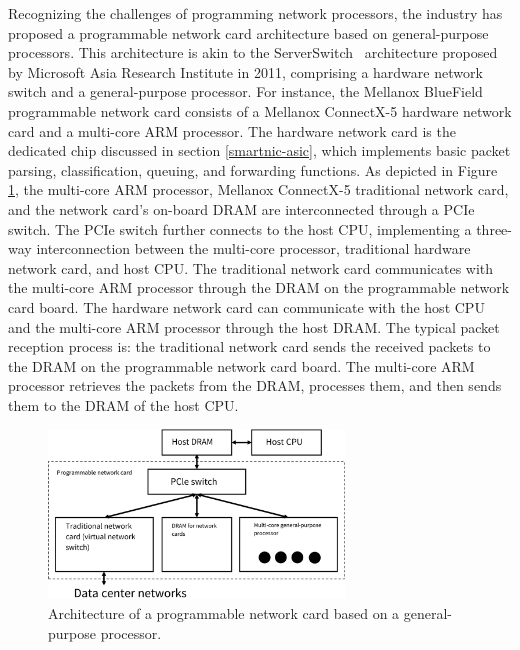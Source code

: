 Recognizing the challenges of programming network processors, the industry has proposed a programmable network card architecture based on general-purpose processors. This architecture is akin to the ServerSwitch~\cite{lu2011serverswitch} architecture proposed by Microsoft Asia Research Institute in 2011, comprising a hardware network switch and a general-purpose processor. For instance, the Mellanox BlueField \cite{mellanox-bluefield} programmable network card consists of a Mellanox ConnectX-5 hardware network card and a multi-core ARM processor. The hardware network card is the dedicated chip discussed in section \ref{smartnic-asic}, which implements basic packet parsing, classification, queuing, and forwarding functions. As depicted in Figure \ref{background:fig:smartnic_soc}, the multi-core ARM processor, Mellanox ConnectX-5 traditional network card, and the network card's on-board DRAM are interconnected through a PCIe switch. The PCIe switch further connects to the host CPU, implementing a three-way interconnection between the multi-core processor, traditional hardware network card, and host CPU. The traditional network card communicates with the multi-core ARM processor through the DRAM on the programmable network card board. The hardware network card can communicate with the host CPU and the multi-core ARM processor through the host DRAM. The typical packet reception process is: the traditional network card sends the received packets to the DRAM on the programmable network card board. The multi-core ARM processor retrieves the packets from the DRAM, processes them, and then sends them to the DRAM of the host CPU.

\begin{figure}[htbp]
	\centering
	\includegraphics[width=0.7\textwidth]{figures/smartnic_soc.pdf}
	\caption{Architecture of a programmable network card based on a general-purpose processor.}
	\label{background:fig:smartnic_soc}
\end{figure}

